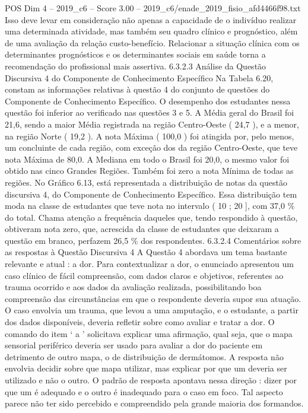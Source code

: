 \begin{textsample}{POS Dim 4 – 2019\_c6 – Score 3.00 – 2019\_c6/enade\_2019\_fisio\_afd4466f98.txt}
Isso deve levar em consideração não apenas a capacidade de o indivíduo realizar uma determinada atividade, mas também seu quadro clínico e prognóstico, além de uma avaliação da relação custo-benefício.
Relacionar a situação clínica com os determinantes prognósticos e os determinantes sociais em saúde torna a recomendação do profissional mais assertiva. 6.3.2.3 Análise da Questão Discursiva 4 do Componente de Conhecimento Específico Na Tabela 6.20, constam as informações relativas à questão 4 do conjunto de questões do Componente de Conhecimento Específico.
O desempenho dos estudantes nessa questão foi inferior ao verificado nas questões 3 e 5.
A Média geral do Brasil foi 21,6, sendo a maior Média registrada na região Centro-Oeste ( 24,7 ), e a menor, na região Norte ( 19,2 ).
A nota Máxima ( 100,0 ) foi atingida por, pelo menos, um concluinte de cada região, com exceção dos da região Centro-Oeste, que teve nota Máxima de 80,0.
A Mediana em todo o Brasil foi 20,0, o mesmo valor foi obtido nas cinco Grandes Regiões.
Também foi zero a nota Mínima de todas as regiões.
No Gráfico 6.13, está representada a distribuição de notas da questão discursiva 4, do Componente de Conhecimento Específico.
Essa distribuição tem moda na classe de estudantes que teve nota no intervalo ( 10 ; 20 ], com 37,0 \% do total.
Chama atenção a frequência daqueles que, tendo respondido à questão, obtiveram nota zero, que, acrescida da classe de estudantes que deixaram a questão em branco, perfazem 26,5 \% dos respondentes. 6.3.2.4 Comentários sobre as respostas à Questão Discursiva 4 A Questão 4 abordava um tema bastante relevante e atual : a dor.
Para contextualizar a dor, o enunciado apresentou um caso clínico de fácil compreensão, com dados claros e objetivos, referentes ao trauma ocorrido e aos dados da avaliação realizada, possibilitando boa compreensão das circunstâncias em que o respondente deveria supor sua atuação.
O caso envolvia um trauma, que levou a uma amputação, e o estudante, a partir dos dados disponíveis, deveria refletir sobre como avaliar e tratar a dor.
O comando do item ‘ a ’ solicitava explicar uma afirmação, qual seja, que o mapa sensorial periférico deveria ser usado para avaliar a dor do paciente em detrimento de outro mapa, o de distribuição de dermátomos.
A resposta não envolvia decidir sobre que mapa utilizar, mas explicar por que um deveria ser utilizado e não o outro.
O padrão de resposta apontava nessa direção : dizer por que um é adequado e o outro é inadequado para o caso em foco.
Tal aspecto parece não ter sido percebido e compreendido pela grande maioria dos formandos.

\end{textsample}
